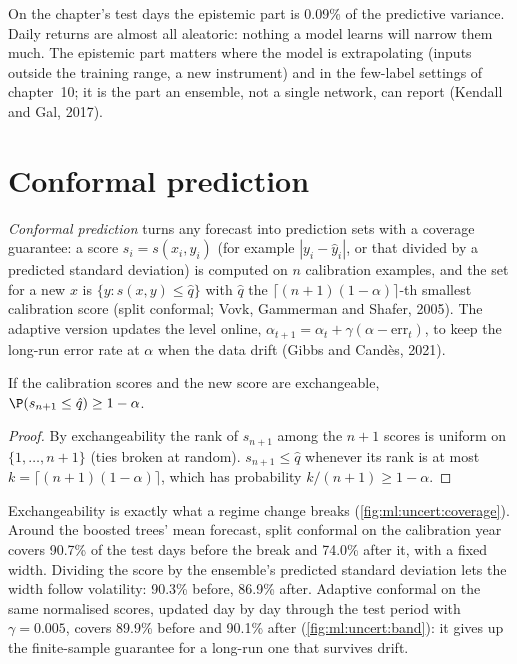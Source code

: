 On the chapter's test days the epistemic part is 0.09\% of the predictive variance. Daily returns are almost all
aleatoric: nothing a model learns will narrow them much. The epistemic part matters where the model is extrapolating
(inputs outside the training range, a new instrument) and in the few-label settings of chapter~10; it is the part an
ensemble, not a single network, can report (Kendall and Gal, 2017).

\section{Conformal prediction}

\begin{definition}\label{def:ml:probabilistic-models-and-uncertainty:conformal}
\emph{Conformal prediction} turns any forecast into prediction sets with a coverage
guarantee: a score $s_i = s(x_i, y_i)$ (for example $|y_i - \hat y_i|$, or that divided by a predicted standard
deviation) is computed on $n$ calibration examples, and the set for a new $x$ is $\{y: s(x, y)\le\hat q\}$ with $\hat q$ the
$\lceil(n+1)(1 - \alpha)\rceil$-th smallest calibration score (split conformal; Vovk, Gammerman and Shafer, 2005). The
adaptive version updates the level online, $\alpha_{t+1} = \alpha_t + \gamma(\alpha - \mathrm{err}_t)$, to keep the
long-run error rate at $\alpha$ when the data drift (Gibbs and Candès, 2021).
\end{definition}

\begin{theorem}\label{thm:ml:uncert:conformal}
If the calibration scores and the new score are exchangeable, $\P(s_{n+1}\le\hat q)\ge1 - \alpha$.
\end{theorem}

\begin{proof}
By exchangeability the rank of $s_{n+1}$ among the $n + 1$ scores is uniform on $\{1,\dots,n+1\}$ (ties broken at random).
$s_{n+1}\le\hat q$ whenever its rank is at most $k = \lceil(n+1)(1-\alpha)\rceil$, which has probability
$k/(n+1)\ge1 - \alpha$.
\end{proof}

Exchangeability is exactly what a regime change breaks (\cref{fig:ml:uncert:coverage}). Around the boosted trees' mean
forecast, split conformal on the calibration year covers 90.7\% of the test days before the break and 74.0\% after it,
with a fixed width. Dividing the score by the ensemble's predicted standard deviation lets the width follow volatility:
90.3\% before, 86.9\% after. Adaptive conformal on the same normalised scores, updated day by day through the test
period with $\gamma = 0.005$, covers 89.9\% before and 90.1\% after (\cref{fig:ml:uncert:band}): it gives up the
finite-sample guarantee for a long-run one that survives drift.

